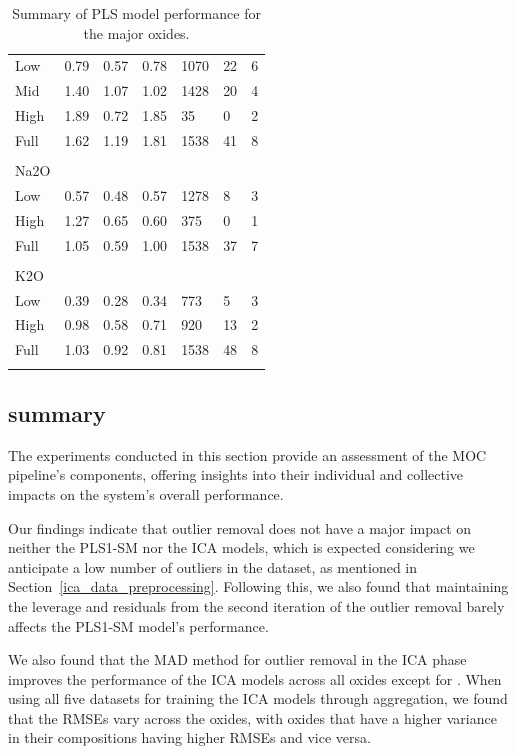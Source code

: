 \begin{table}[htbp]
\begin{tabular*}{\textwidth}{@{\extracolsep{\fill}} lllllll}
  Low & 0.79 & 0.57 & 0.78 & 1070 & 22 & 6 \\
  Mid & 1.40 & 1.07 & 1.02 & 1428 & 20 & 4 \\
  High & 1.89 & 0.72 & 1.85 & 35 & 0 & 2 \\
  Full & 1.62 & 1.19 & 1.81 & 1538 & 41 & 8 \\
\\
Na2O &&&&&& \\
  Low & 0.57 & 0.48 & 0.57 & 1278 & 8 & 3 \\
  High & 1.27 & 0.65 & 0.60 & 375 & 0 & 1 \\
  Full & 1.05 & 0.59 & 1.00 & 1538 & 37 & 7 \\
\\
K2O &&&&&& \\
  Low & 0.39 & 0.28 & 0.34 & 773 & 5 & 3 \\
  High & 0.98 & 0.58 & 0.71 & 920 & 13 & 2 \\
  Full & 1.03 & 0.92 & 0.81 & 1538 & 48 & 8 \\
\\

\end{tabular*}
\caption{Summary of PLS model performance for the major oxides.}
\label{table:rmsecv_results}
\end{table}








\subsection{summary}\label{sec:experiments_summary}
The experiments conducted in this section provide an assessment of the MOC pipeline's components, offering insights into their individual and collective impacts on the system's overall performance.

Our findings indicate that outlier removal does not have a major impact on neither the PLS1-SM nor the ICA models, which is expected considering we anticipate a low number of outliers in the dataset, as mentioned in Section~\ref{ica_data_preprocessing}.
Following this, we also found that maintaining the leverage and residuals from the second iteration of the outlier removal barely affects the PLS1-SM model's performance.

We also found that the MAD method for outlier removal in the ICA phase improves the performance of the ICA models across all oxides except for .
When using all five datasets for training the ICA models through aggregation, we found that the RMSEs vary across the oxides, with oxides that have a higher variance in their compositions having higher RMSEs and vice versa.

